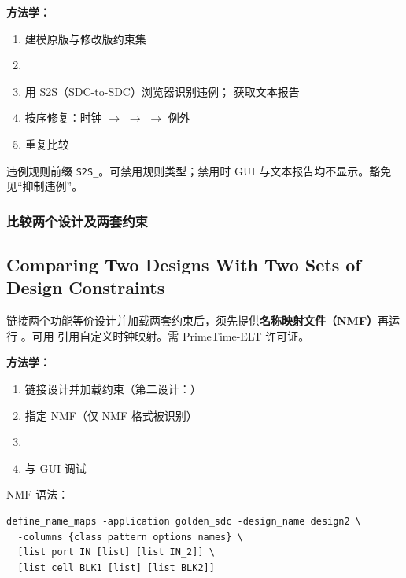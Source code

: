 \textbf{方法学：}
\begin{enumerate}
  \item {} 建模原版与修改版约束集
  \item {}
  \item 用 S2S（SDC-to-SDC）浏览器识别违例； 获取文本报告
  \item 按序修复：时钟 $\rightarrow$  $\rightarrow$  $\rightarrow$ 例外
  \item 重复比较
\end{enumerate}


违例规则前缀 \texttt{S2S\_}。可禁用规则类型；禁用时 GUI 与文本报告均不显示。豁免见“抑制违例”。

\subsubsection{比较两个设计及两套约束}
\subsection*{Comparing Two Designs With Two Sets of Design Constraints}

链接两个功能等价设计并加载两套约束后，须先提供\textbf{名称映射文件（NMF）}再运行 。可用  引用自定义时钟映射。需 PrimeTime-ELT 许可证。

\textbf{方法学：}
\begin{enumerate}
  \item 链接设计并加载约束（第二设计：）
  \item {} 指定 NMF（仅 NMF 格式被识别）
  \item {}
  \item {} 与 GUI 调试
\end{enumerate}

NMF 语法：
\begin{lstlisting}
define_name_maps -application golden_sdc -design_name design2 \
  -columns {class pattern options names} \
  [list port IN [list] [list IN_2]] \
  [list cell BLK1 [list] [list BLK2]]
\end{lstlisting}

